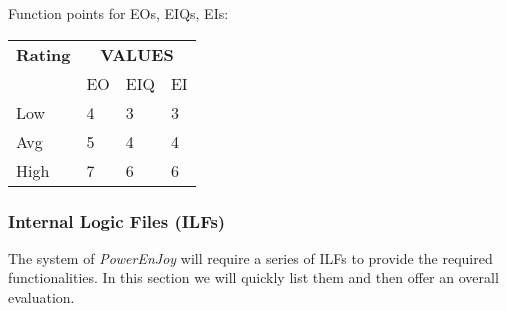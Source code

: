 \begin{center}
		\vspace{1cm}
		
		Function points for EOs, EIQs, EIs:
		
		\begin{tabular}{|l|l|l|l|}
			\hline
			\textbf{Rating} & \multicolumn{3}{|c|}{\textbf{VALUES}} \\ \cline{2-4}
			 & EO & EIQ & EI\\ \hline
			 Low & 4 & 3 & 3\\ \hline
			 Avg & 5 & 4 & 4\\ \hline
			 High & 7 & 6 & 6\\ \hline
		\end{tabular}
		
	\end{center}


\subsubsection{Internal Logic Files (ILFs)}
The system of \textit{PowerEnJoy} will require a series of ILFs to provide the required functionalities. In this section we will quickly list them and then offer an overall evaluation.

